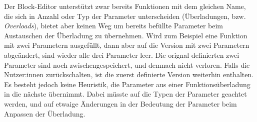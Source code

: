 Der Block-Editor unterstützt zwar bereits Funktionen mit dem gleichen Name, die sich in Anzahl oder Typ der Parameter unterscheiden (Überladungen, bzw. \textit{Overloads}), bietet aber keinen Weg um bereits befüllte Parameter beim Austauschen der Überladung zu übernehmen. Wird zum Beispiel eine Funktion mit zwei Parametern ausgefüllt, dann aber auf die Version mit zwei Parametern abgeändert, sind wieder alle drei Parameter leer. Die orignal definierten zwei Parameter sind noch zwischengespeichert, und demnach nicht verloren. Falls die Nutzer:innen zurückschalten, ist die zuerst definierte Version weiterhin enthalten. Es besteht jedoch keine Heuristik, die Parameter aus einer Funktionsüberladung in die nächste übernimmt. Dabei müsste auf die Typen der Parameter geachtet werden, und auf etwaige Änderungen in der Bedeutung der Parameter beim Anpassen der Überladung.

